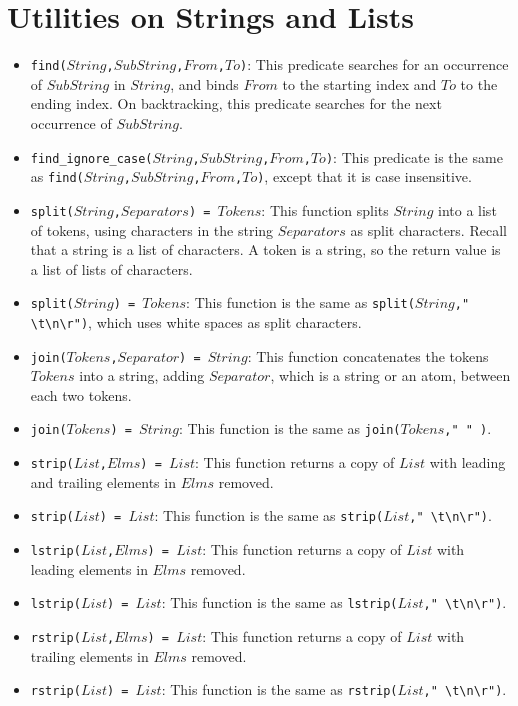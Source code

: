 \section{Utilities on Strings and Lists}
\begin{itemize}
\item \texttt{find($String$,$SubString$,$From$,$To$)}: This predicate searches for an occurrence of $SubString$ in $String$, and binds $From$ to the starting index and $To$ to the ending index. On backtracking, this predicate searches for the next occurrence of $SubString$.
\item \texttt{find\_ignore\_case($String$,$SubString$,$From$,$To$)}: This predicate is the same as \texttt{find($String$,$SubString$,$From$,$To$)}, except that it is case insensitive.
\item \texttt{split($String$,$Separators$) = $Tokens$}: This function splits $String$ into a list of tokens, using characters in the string $Separators$ as split characters. Recall that a string is a list of characters. A token is a string, so the return value is a list of lists of characters.
\item \texttt{split($String$) = $Tokens$}: This function is the same as \texttt{split($String$,}\verb+" \t\n\r")+, which uses white spaces as split characters.
\item \texttt{join($Tokens$,$Separator$) = $String$}: This function concatenates the tokens $Tokens$ into a string, adding $Separator$, which is a string or an atom, between each two tokens.
\item \texttt{join($Tokens$) = $String$}: This function is the same as \texttt{join($Tokens$," " )}.
\item \texttt{strip($List$,$Elms$) = $List$}: This function returns a copy of $List$ with leading and trailing elements in $Elms$ removed.
\item \texttt{strip($List$) = $List$}: This function is the same as \texttt{strip($List$,}\verb+" \t\n\r")+. 
\item \texttt{lstrip($List$,$Elms$) = $List$}: This function returns a copy of $List$ with leading  elements in $Elms$ removed.
\item \texttt{lstrip($List$) = $List$}: This function is the same as \texttt{lstrip($List$,}\verb+" \t\n\r")+. 
\item \texttt{rstrip($List$,$Elms$) = $List$}: This function returns a copy of $List$ with trailing elements in $Elms$ removed.
\item \texttt{rstrip($List$) = $List$}: This function is the same as \texttt{rstrip($List$,}\verb+" \t\n\r")+. 
\end{itemize}

